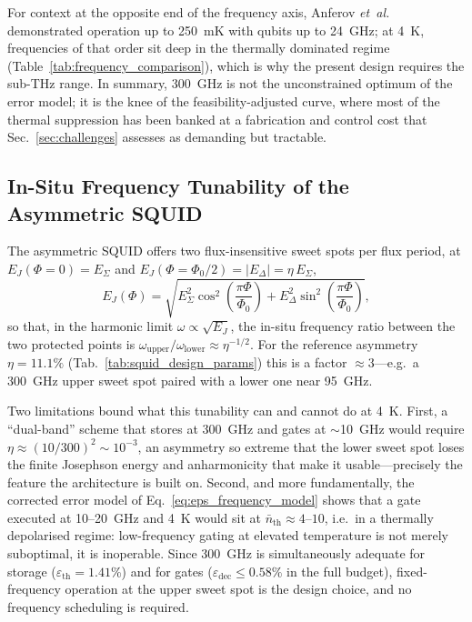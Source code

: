 For context at the opposite end of the frequency axis, Anferov
\emph{et~al.}~\cite{Anferov2024HighTemp} demonstrated operation up to
\SI{250}{\milli\kelvin} with qubits up to \SI{24}{\giga\hertz}; at
\SI{4}{\kelvin}, frequencies of that order sit deep in the thermally dominated
regime (Table~\ref{tab:frequency_comparison}), which is why the present design
requires the sub-THz range. In summary, \SI{300}{\giga\hertz} is not the
unconstrained optimum of the error model; it is the knee of the
feasibility-adjusted curve, where most of the thermal suppression has been
banked at a fabrication and control cost that Sec.~\ref{sec:challenges}
assesses as demanding but tractable.

\subsection{In-Situ Frequency Tunability of the Asymmetric SQUID}
\label{subsec:insitu_tunability}

The asymmetric SQUID offers two flux-insensitive sweet spots per flux period,
at $E_J(\Phi{=}0) = E_\Sigma$ and
$E_J(\Phi{=}\Phi_0/2) = |E_\Delta| = \eta\,E_\Sigma$,
\begin{equation}
E_J(\Phi) = \sqrt{E_\Sigma^2 \cos^2\!\left(\frac{\pi\Phi}{\Phi_0}\right)
+ E_\Delta^2 \sin^2\!\left(\frac{\pi\Phi}{\Phi_0}\right)} ,
\end{equation}
so that, in the harmonic limit $\omega \propto \sqrt{E_J}$, the in-situ
frequency ratio between the two protected points is
$\omega_{\text{upper}}/\omega_{\text{lower}} \approx \eta^{-1/2}$. For the
reference asymmetry $\eta = 11.1\%$ (Tab.~\ref{tab:squid_design_params}) this
is a factor $\approx 3$---e.g.\ a \SI{300}{\giga\hertz} upper sweet spot paired
with a lower one near \SI{95}{\giga\hertz}.

Two limitations bound what this tunability can and cannot do at
\SI{4}{\kelvin}. First, a ``dual-band'' scheme that stores at
\SI{300}{\giga\hertz} and gates at $\sim$\SI{10}{\giga\hertz} would require
$\eta \approx (10/300)^2 \sim 10^{-3}$, an asymmetry so extreme that the lower
sweet spot loses the finite Josephson energy and anharmonicity that make it
usable---precisely the feature the architecture is built on. Second, and more
fundamentally, the corrected error model of
Eq.~\eqref{eq:eps_frequency_model} shows that a gate executed at
\SI{10}{}--\SI{20}{\giga\hertz} and \SI{4}{\kelvin} would sit at
$\bar{n}_{\text{th}} \approx 4$--$10$, i.e.\ in a thermally depolarised
regime: low-frequency gating at elevated temperature is not merely
suboptimal, it is inoperable. Since \SI{300}{\giga\hertz} is simultaneously
adequate for storage ($\varepsilon_{\text{th}} = 1.41\%$) and for gates
($\varepsilon_{\text{dec}} \leq 0.58\%$ in the full budget), fixed-frequency
operation at the upper sweet spot is the design choice, and no frequency
scheduling is required.

